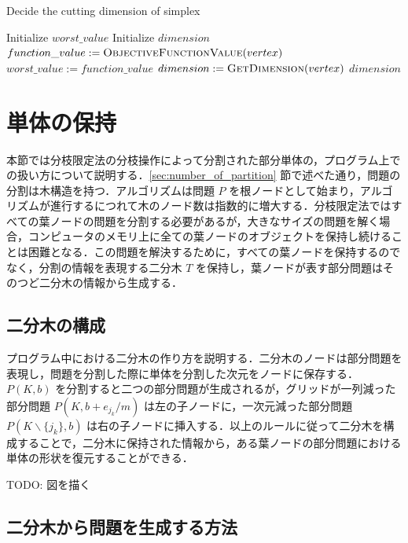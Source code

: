 \documentclass[a4paper,11pt]{jreport}
\begin{document}
\begin{algorithm}
\caption{Decide the cutting dimension of simplex}
\label{algo:cutting_dimension}
\begin{algorithmic}[1]
\State Initialize $ worst\_value $
\State Initialize $ dimension $
\State $ function\_value := \Call{ObjectiveFunctionValue}{vertex} $
\State $ worst\_value := function\_value $
\State $ dimension := \Call{GetDimension}{vertex} $
\EndIf
\EndFor
\State \Return $ dimension $
\EndFunction
\end{algorithmic}
\end{algorithm}

\section{単体の保持}

本節では分枝限定法の分枝操作によって分割された部分単体の，プログラム上での扱い方について説明する．\ref{sec:number_of_partition} 節で述べた通り，問題の分割は木構造を持つ．アルゴリズムは問題 $ P $ を根ノードとして始まり，アルゴリズムが進行するにつれて木のノード数は指数的に増大する．分枝限定法ではすべての葉ノードの問題を分割する必要があるが，大きなサイズの問題を解く場合，コンピュータのメモリ上に全ての葉ノードのオブジェクトを保持し続けることは困難となる．この問題を解決するために，すべての葉ノードを保持するのでなく，分割の情報を表現する二分木 $ T $ を保持し，葉ノードが表す部分問題はそのつど二分木の情報から生成する．\par

\subsection{二分木の構成}

プログラム中における二分木の作り方を説明する．二分木のノードは部分問題を表現し，問題を分割した際に単体を分割した次元をノードに保存する．$ P(K, b) $ を分割すると二つの部分問題が生成されるが，グリッドが一列減った部分問題 $ P(K, b + e_{j_k} / m) $ は左の子ノードに，一次元減った部分問題 $ P(K \backslash \{ j_k \}, b) $ は右の子ノードに挿入する．以上のルールに従って二分木を構成することで，二分木に保持された情報から，ある葉ノードの部分問題における単体の形状を復元することができる．\par
TODO: 図を描く\par

\subsection{二分木から問題を生成する方法}
\end{document}
